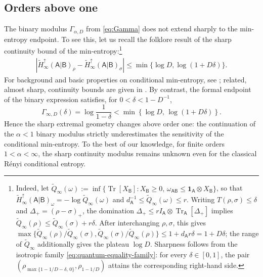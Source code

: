 \documentclass[11pt,reqno]{amsart}
\theoremstyle{definition}
\DeclareMathOperator{\Tr}{Tr}
\newcommand{\I}{\mathbf 1}
\newcommand{\A}{\mathsf{A}}
\newcommand{\B}{\mathsf{B}}
\newcommand{\abs}[1]{\left\lvert#1\right\rvert}
\newcommand{\sand}{\widetilde}
\begin{document}
\subsection{Orders above one}
The binary modulus \(\Gamma_{\alpha,D}\) from \cref{eq:Gamma} does not
extend sharply to the min-entropy endpoint. 
To see this, let us recall the folklore result of the sharp continuity bound of the min-entropy:\footnote{Indeed, let
\(\sand Q_{\infty}(\omega):=\inf\{\Tr [X_{\mathsf B}]:X_{\mathsf B}\geq0,\,
\omega_{\mathsf A\mathsf B}\leq \I_{\mathsf A}\otimes X_{\mathsf B}\}\),
so that
\(\widetilde H_\infty^\uparrow(\mathsf A|\mathsf B)_\omega=-\log \sand Q_{\infty}(\omega)\)
and \(d_{\mathsf A}^{-1}\leq \sand Q_{\infty}(\omega)\leq r\).
Writing \(T(\rho,\sigma)\leq\delta\) and
\(\Delta_+=(\rho-\sigma)_+\), the domination
\(\Delta_+\leq rI_{\mathsf A}\otimes\Tr_{\mathsf A}[\Delta_+]\)
implies \(\sand Q_{\infty}(\rho)\leq \sand Q_{\infty}(\sigma)+r\delta\).
After interchanging \(\rho,\sigma\), this gives
\(\max\{\sand Q_{\infty}(\rho)/\sand Q_{\infty}(\sigma),\sand Q_{\infty}(\sigma)/\sand Q_{\infty}(\rho)\}
 \leq1+d_{\mathsf A}r\delta=1+D\delta\);
the range of \(\sand Q_{\infty}\) additionally gives the plateau \(\log D\).
Sharpness follows from the isotropic family
\eqref{eq:quantum-equality-family}: for every
\(\delta\in[0,1]\), the pair 
$\left(
\rho_{\max\{1-1/D-\delta,\,0\}},
\rho_{1-1/D}
\right)$
attains the corresponding right-hand side.
}
\begin{align}
\abs{\sand H_{\infty}^\uparrow(\A|\B)_\rho
				-\sand H_{\infty}^\uparrow(\A|\B)_\sigma}
			\leq
            \min\{\log D, \log(1+D\delta)\}.
\end{align}
For background and basic properties on conditional min-entropy, see
\cite{tom-thesis}; related, almost sharp, continuity bounds are
given in \cite{BeigiGoodarzi2023, BluhmCapelGondolfMoebus2026}.
By contrast, the formal endpoint of the binary expression satisfies,
for \(0<\delta<1-D^{-1}\),
\begin{equation}
    \Gamma_{\infty,D}(\delta)
    =
    \log\frac1{1-\delta}
    <
    \min\left\{
        \log D,\,
        \log(1+D\delta)
    \right\}.
\end{equation}
Hence the sharp extremal geometry changes above order one: the continuation
of the \(\alpha<1\) binary modulus strictly underestimates the sensitivity
of the conditional min-entropy.  To the best of our knowledge, for finite
orders \(1<\alpha<\infty\), the sharp continuity modulus remains unknown
even for the classical R\'enyi conditional entropy.
\end{document}
